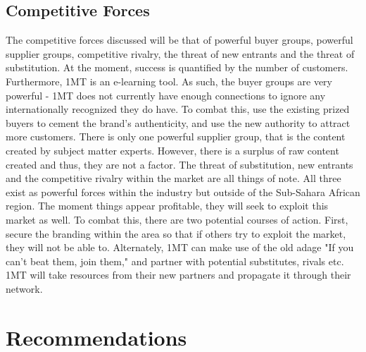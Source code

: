 \documentclass[letterpaper]{article}
\begin{document}
    \subsection{Competitive Forces}

        The competitive forces discussed will be that of powerful buyer groups, powerful supplier groups, competitive rivalry, the threat of new entrants and the threat of substitution. At the moment, success is quantified by the number of customers. Furthermore, 1MT is an e-learning tool. As such, the buyer groups are very powerful - 1MT does not currently have enough connections to ignore any internationally recognized they do have. To combat this, use the existing prized buyers to cement the brand's authenticity, and use the new authority to attract more customers. There is only one powerful supplier group, that is the content created by subject matter experts. However, there is a surplus of raw content created and thus, they are not a factor. The threat of substitution, new entrants and the competitive rivalry within the market are all things of note. All three exist as powerful forces within the industry but outside of the Sub-Sahara African region. The moment things appear profitable, they will seek to exploit this market as well. To combat this, there are two potential courses of action. First, secure the branding within the area so that if others try to exploit the market, they will not be able to. Alternately, 1MT can make use of the old adage "If you can't beat them, join them," and partner with potential substitutes, rivals etc. 1MT will take resources from their new partners and propagate it through their network.

\section{Recommendations}
\end{document}
